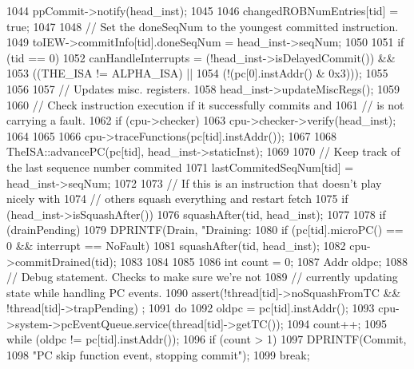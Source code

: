 \begin{DoxyCode}
{{{{1044                 ppCommit->notify(head_inst);
1045 
1046                 changedROBNumEntries[tid] = true;
1047 
1048                 // Set the doneSeqNum to the youngest committed instruction.
1049                 toIEW->commitInfo[tid].doneSeqNum = head_inst->seqNum;
1050 
1051                 if (tid == 0) {
1052                     canHandleInterrupts =  (!head_inst->isDelayedCommit()) &&
1053                                            ((THE_ISA != ALPHA_ISA) ||
1054                                              (!(pc[0].instAddr() & 0x3)));
1055                 }
1056 
1057                 // Updates misc. registers.
1058                 head_inst->updateMiscRegs();
1059 
1060                 // Check instruction execution if it successfully commits and
1061                 // is not carrying a fault.
1062                 if (cpu->checker) {
1063                     cpu->checker->verify(head_inst);
1064                 }
1065 
1066                 cpu->traceFunctions(pc[tid].instAddr());
1067 
1068                 TheISA::advancePC(pc[tid], head_inst->staticInst);
1069 
1070                 // Keep track of the last sequence number commited
1071                 lastCommitedSeqNum[tid] = head_inst->seqNum;
1072 
1073                 // If this is an instruction that doesn't play nicely with
1074                 // others squash everything and restart fetch
1075                 if (head_inst->isSquashAfter())
1076                     squashAfter(tid, head_inst);
1077 
1078                 if (drainPending) {
1079                     DPRINTF(Drain, "Draining: %
1080                     if (pc[tid].microPC() == 0 && interrupt == NoFault) {
1081                         squashAfter(tid, head_inst);
1082                         cpu->commitDrained(tid);
1083                     }
1084                 }
1085 
1086                 int count = 0;
1087                 Addr oldpc;
1088                 // Debug statement.  Checks to make sure we're not
1089                 // currently updating state while handling PC events.
1090                 assert(!thread[tid]->noSquashFromTC && !thread[tid]->trapPending)
      ;
1091                 do {
1092                     oldpc = pc[tid].instAddr();
1093                     cpu->system->pcEventQueue.service(thread[tid]->getTC());
1094                     count++;
1095                 } while (oldpc != pc[tid].instAddr());
1096                 if (count > 1) {
1097                     DPRINTF(Commit,
1098                             "PC skip function event, stopping commit\n");
1099                     break;
}}}}}
\end{DoxyCode}
